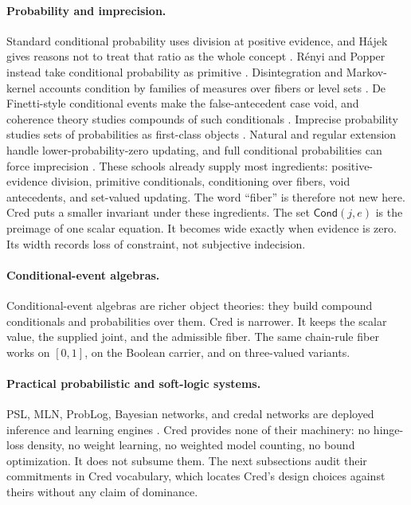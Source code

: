 \documentclass[11pt,a4paper]{article}
\newcommand{\Cond}{\mathsf{Cond}}
\begin{document}
\paragraph{Probability and imprecision.}
Standard conditional probability uses
division at positive evidence, and H\'ajek gives reasons not to treat
that ratio as the whole concept \cite{hajek2003conditional}.  R\'enyi
and Popper instead take
conditional probability as primitive
\cite{renyi1955,popper1959,krauss1968,dubins1975}.  Disintegration and
Markov-kernel accounts condition by families of measures over fibers or
level sets \cite{chang1997,fritz2020}.  De Finetti-style conditional
events make the false-antecedent case void, and coherence theory studies
compounds of such conditionals
\cite{definetti1936,gilio2013,gilio2014,flaminio2020conditionals}.
Imprecise probability studies sets of probabilities as first-class
objects \cite{walley1991,troffaes2014}.  Natural and regular extension
handle lower-probability-zero updating, and full conditional
probabilities can force imprecision
\cite{debock2015,wheeler2021}.  These schools already supply most
ingredients: positive-evidence division, primitive conditionals,
conditioning over fibers, void antecedents, and set-valued updating.
The word ``fiber'' is therefore not new here.  Cred puts a smaller
invariant under these ingredients.  The set $\Cond(j,e)$ is the
preimage of one scalar equation.  It becomes wide exactly when evidence
is zero.  Its width records loss of constraint, not subjective
indecision.

\paragraph{Conditional-event algebras.}
Conditional-event algebras are richer object theories: they build
compound conditionals and probabilities over them.  Cred is narrower.
It keeps the scalar value, the supplied joint, and the admissible
fiber.  The same chain-rule fiber works on $[0,1]$, on the Boolean
carrier, and on three-valued variants.

\paragraph{Practical probabilistic and soft-logic systems.}
PSL, MLN, ProbLog, Bayesian networks, and credal networks are deployed
inference and learning engines
\cite{bach2017,richardson2006,deraedt2007,pearl1988,cozman2000}.  Cred
provides none of their machinery: no hinge-loss density, no weight
learning, no weighted model counting, no bound optimization.  It does
not subsume them.  The next subsections audit their commitments in Cred
vocabulary, which locates Cred's design choices against theirs without
any claim of dominance.
\end{document}
